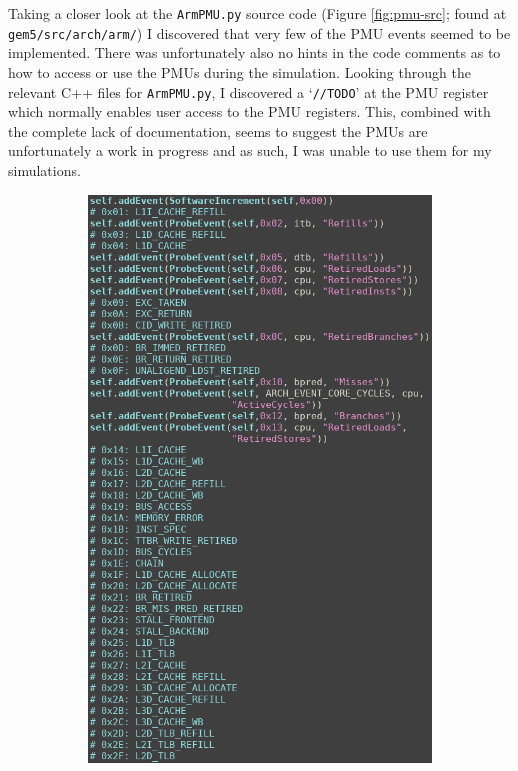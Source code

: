 Taking a closer look at the \texttt{ArmPMU.py} source code (Figure 
\ref{fig:pmu-src}; found at\linebreak
\texttt{gem5/src/arch/arm/}) I discovered that very few of the PMU events 
seemed to be implemented. There was unfortunately also no hints in the code 
comments as to how to access or use the PMUs during the simulation. Looking 
through the relevant C++ files for \texttt{ArmPMU.py}, I discovered a 
`\texttt{//TODO}' at the PMU register which normally enables user access to the 
PMU registers. This, combined with the complete lack of documentation, seems to 
suggest the PMUs are unfortunately a work in progress and as such, I was unable 
to use them for my simulations.
\begin{figure}[H]
    \centering
    \begin{subfigure}{0.64\textwidth}
        \centering
        \includegraphics[width=\linewidth]{screenshots/sim-pmu/very-few.png}

\end{subfigure}
\end{figure}
